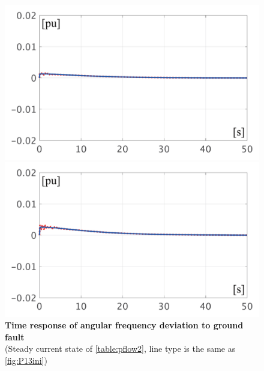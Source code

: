 \documentclass[tombow,dvipdfmx]{corona-a5-1.1}
\begin{document}
\begin{figure}[t]
  \centering
  {
  \begin{minipage}{0.49\linewidth}
    \centering
    \includegraphics[width = 1.0\linewidth]{figs/50mP3}
  \end{minipage}
  \begin{minipage}{0.49\linewidth}
    \centering
    \includegraphics[width = 1.0\linewidth]{figs/100mP3}
  \end{minipage}
  \medskip
  \caption{\textbf{Time response of angular frequency deviation to ground fault}
  \\ \centering (Steady current state of \ref{table:pflow2}, line type is the same as \ref{fig:P13ini})}
  \label{fig:P3fault}
  }
\medskip
\end{figure}
\end{document}
